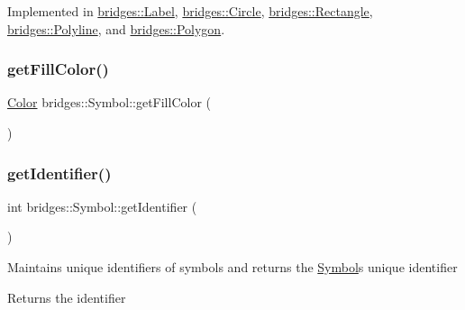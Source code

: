 Implemented in \mbox{\hyperlink{classbridges_1_1_label_a97d5638f629edbd6733b8f8572ca42ba}{bridges\+::\+Label}}, \mbox{\hyperlink{classbridges_1_1_circle_a06e97818128abf9b9caa72aa4d05a704}{bridges\+::\+Circle}}, \mbox{\hyperlink{classbridges_1_1_rectangle_a459587616a9674f6f0f02bac08589e23}{bridges\+::\+Rectangle}}, \mbox{\hyperlink{classbridges_1_1_polyline_aa0ce633fa1bb6460f507fe98026de443}{bridges\+::\+Polyline}}, and \mbox{\hyperlink{classbridges_1_1_polygon_a6ad07473cb57633eca62a3f6832ea08c}{bridges\+::\+Polygon}}.

\mbox{\label{classbridges_1_1_symbol_affd9e9f49524a920d53a490782fab9c9}} 
\subsubsection{\texorpdfstring{get\+Fill\+Color()}{getFillColor()}}
{\footnotesize\ttfamily \mbox{\hyperlink{classbridges_1_1_color}{Color}} bridges\+::\+Symbol\+::get\+Fill\+Color (\begin{DoxyParamCaption}{ }\end{DoxyParamCaption})\hspace{0.3cm}{\ttfamily [inline]}}

\mbox{\label{classbridges_1_1_symbol_a6006dfc7fcaeff3dbead8bcf647ccff6}} 
\subsubsection{\texorpdfstring{get\+Identifier()}{getIdentifier()}}
{\footnotesize\ttfamily int bridges\+::\+Symbol\+::get\+Identifier (\begin{DoxyParamCaption}{ }\end{DoxyParamCaption})\hspace{0.3cm}{\ttfamily [inline]}}

Maintains unique identifiers of symbols and returns the \mbox{\hyperlink{classbridges_1_1_symbol}{Symbol}}\textquotesingle{}s unique identifier

\begin{DoxyReturn}{Returns}
the identifier 
\end{DoxyReturn}
\mbox{\label{classbridges_1_1_symbol_a6d19ee38cdb8a07a19cf53840e93cbbb}} 
